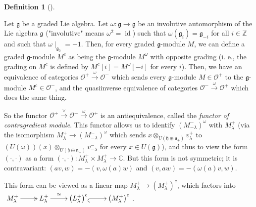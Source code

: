 \documentclass
[numbers=enddot,12pt,final,onecolumn,german,notitlepage]{scrartcl}%
\makeatletter
\newcommand{\arinj}{\ar@{_{(}->}}
\newcommand{\arsurj}{\ar@{->>}}
\theoremstyle{definition}
\newtheorem{defi}[theo]{Definition}
\newenvironment{definition}[1][]
{\begin{defi}[#1]\begin{leftbar}}
{\end{leftbar}\end{defi}}
\makeatother
\begin{document}
\begin{definition}
\label{def.invol}Let $\mathfrak{g}$ be a graded Lie algebra. Let
$\omega:\mathfrak{g}\rightarrow\mathfrak{g}$ be an involutive automorphism of
the Lie algebra $\mathfrak{g}$ ("involutive" means $\omega^{2}%
=\operatorname*{id}$) such that $\omega\left(  \mathfrak{g}_{i}\right)
=\mathfrak{g}_{-i}$ for all $i\in\mathbb{Z}$ and such that $\omega
\mid_{\mathfrak{g}_{0}}=-1$. Then, for every graded $\mathfrak{g}$-module $M$,
we can define a graded $\mathfrak{g}$-module $M^{c}$ as being the
$\mathfrak{g}$-module $M^{\omega}$ with opposite grading (i. e., the grading
on $M^{c}$ is defined by $M^{c}\left[  i\right]  =M^{\omega}\left[  -i\right]
$ for every $i$). Then, we have an equivalence of categories $\mathcal{O}%
^{+}\overset{\omega}{\rightarrow}\mathcal{O}^{-}$ which sends every
$\mathfrak{g}$-module $M\in\mathcal{O}^{+}$ to the $\mathfrak{g}$-module
$M^{c}\in\mathcal{O}^{-}$, and the quasiinverse equivalence of categories
$\mathcal{O}^{-}\overset{\omega}{\rightarrow}\mathcal{O}^{+}$ which does the
same thing.

So the functor $\mathcal{O}^{+}\overset{\vee}{\rightarrow}\mathcal{O}%
^{-}\overset{\omega}{\rightarrow}\mathcal{O}^{+}$ is an antiequivalence,
called the \textit{functor of contragredient module}. This functor allows us
to identify $\left(  M_{-\lambda}^{-}\right)  ^{\omega}$ with $M_{\lambda}%
^{+}$ (via the isomorphism $M_{\lambda}^{+}\rightarrow\left(  M_{-\lambda}%
^{-}\right)  ^{\omega}$ which sends $x\otimes_{U\left(  \mathfrak{h}%
\oplus\mathfrak{n}_{+}\right)  }v_{\lambda}^{+}$ to $\left(  U\left(
\omega\right)  \right)  \left(  x\right)  \otimes_{U\left(  \mathfrak{h}%
\oplus\mathfrak{n}_{-}\right)  }v_{-\lambda}^{-}$ for every $x\in U\left(
\mathfrak{g}\right)  $), and thus to view the form $\left(  \cdot
,\cdot\right)  $ as a form $\left(  \cdot,\cdot\right)  :M_{\lambda}^{+}\times
M_{\lambda}^{+}\rightarrow\mathbb{C}$. But this form is not symmetric; it is
contravariant: $\left(  av,w\right)  =-\left(  v,\omega\left(  a\right)
w\right)  $ and $\left(  v,aw\right)  =-\left(  \omega\left(  a\right)
v,w\right)  $.

This form can be viewed as a linear map $M_{\lambda}^{+}\rightarrow\left(
M_{\lambda}^{+}\right)  ^{c}$, which factors into $%
\xymatrix{
M^{+}_{\lambda} \arsurj[r] & L^{+}_{\lambda} \ar[r]^-{\cong}
& \left(L^{+}_{\lambda}\right)^{c} \arinj[r] & \left(M^{+}_{\lambda}%
\right)^{c}
}%
$.
\end{definition}
\end{document}
